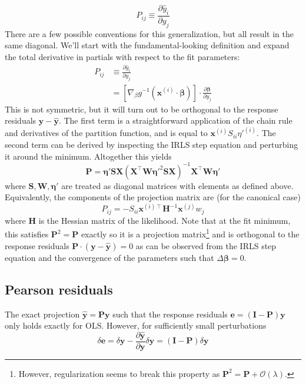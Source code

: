 \documentclass{article}
\newcommand{\bbeta}{\boldsymbol{\beta}}
\begin{document}
\[ P_{ij} \equiv \frac{\partial \hat{y}_i}{\partial y_j} \]
There are a few possible conventions for this generalization, but all result in
the same diagonal. We'll start with the fundamental-looking definition and
expand the total derivative in partials with respect to the fit parameters:
\begin{align}
P_{ij} &\equiv \frac{\partial \hat{y}_i}{\partial y_j} \\
&= \left[\nabla_\beta g^{-1}\left(\mathbf{x}^{(i)}\cdot\bbeta\right)\right] \cdot \frac{\partial \bbeta}{\partial y_j}
\end{align}
This is not symmetric, but it will turn out to be orthogonal to the response
residuals \(\mathbf{y} - \hat{\mathbf{y}}\). The first term is a
straightforward application of the chain rule and derivatives of the partition
function, and is equal to
\(\mathbf{x}^{(i)}S_{ii}\eta'^{(i)}\). The
second term can be derived by inspecting the IRLS step
equation and perturbing it around the minimum. Altogether this yields
\[ \mathbf{P} = \boldsymbol{\eta}' \mathbf{S} \mathbf{X} \left(\mathbf{X}^\intercal \mathbf{W} \boldsymbol{\eta}'^{2} \mathbf{S} \mathbf{X}\right)^{-1} \mathbf{X}^\intercal \mathbf{W} \boldsymbol{\eta}' \]
where \(\mathbf{S}, \mathbf{W}, \boldsymbol{\eta}'\) are treated as diagonal
matrices with elements as defined above.
Equivalently, the components of the projection matrix are (for the canonical case)
\[ P_{ij} = -S_{ii} \mathbf{x}^{(i)\intercal}\mathbf{H}^{-1}\mathbf{x}^{(j)} w_{j} \]
where \(\mathbf{H}\) is the Hessian matrix of the likelihood.
Note that at the fit minimum, this satisfies
\(\mathbf{P}^2 = \mathbf{P}\) exactly so it is a projection
matrix\footnote{However, regularization seems to break this property as
\(\mathbf{P}^2 = \mathbf{P} + \mathcal{O}(\lambda)\).} and is orthogonal to the
response residuals \(\mathbf{P}\cdot\left(\mathbf{y} - \hat{\mathbf{y}}\right)
= 0\) as can be observed from the IRLS step equation and the convergence of the
parameters such that \(\Delta \bbeta = 0\).

\subsection{Pearson residuals}

The exact projection \(\hat{\mathbf{y}} = \mathbf{P y}\) such that the response
residuals \(\mathbf{e} = (\mathbf{I} - \mathbf{P})\mathbf{y} \) only holds
exactly for OLS. However, for sufficiently small perturbations
\[ \delta \mathbf{e} = \delta\mathbf{y} - \frac{\partial \hat{\mathbf{y}}}{\partial \mathbf{y}} \delta \mathbf{y} = (\mathbf{I} - \mathbf{P}) \delta \mathbf{y} \]
\end{document}
